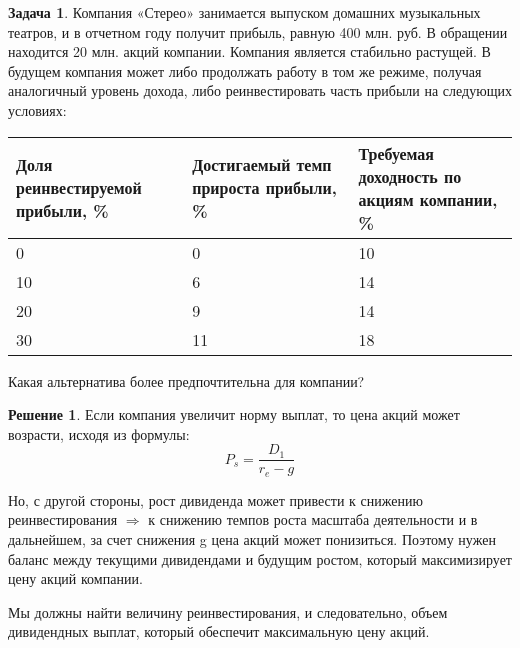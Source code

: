 \documentclass[a4paper, 14pt]{article}
\theoremstyle{plain} %
\theoremstyle{definition} %
\newtheorem*{solution}{Решение}
\newtheorem{problem}{Задача}[subsection]
\theoremstyle{remark} %
\begin{document}
\begin{problem}
	Компания «Стерео» занимается выпуском домашних музыкальных  театров,  и  в  отчетном  году  получит  прибыль, равную 400 млн. руб. В обращении находится 20 млн. акций компании. Компания является стабильно растущей. В будущем компания  может  либо  продолжать  работу  в  том  же  режиме, получая  аналогичный  уровень  дохода,  либо  реинвестировать часть прибыли на следующих условиях:
\begin{center}
\begin{tabular}{|p{4.4cm}|p{4.4cm}|p{4.4cm}|}
\hline
Доля реинвестируемой прибыли, \% & Достигаемый темп прироста прибыли, \% & Требуемая доходность по акциям компании, \%  \\
\hline
0                                & 0                                     & 10                                           \\
\hline
10                               & 6                                     & 14                                           \\
\hline
20                               & 9                                     & 14                                           \\
\hline
30                               & 11                                    & 18                                           \\
\hline
\end{tabular}
\end{center}
Какая альтернатива более предпочтительна для компании?
\begin{solution}
	Если компания увеличит норму выплат, то цена акций может возрасти, исходя из формулы:
	\begin{equation}\label{eq:stocksprice}
		P_{s} = \frac{D_{1}}{r_{e}-g}
	\end{equation}

	Но, с другой стороны, рост дивиденда может привести к снижению реинвестирования $\Rightarrow$ к снижению темпов роста масштаба деятельности и в дальнейшем, за счет снижения g цена акций может понизиться. Поэтому нужен баланс между текущими дивидендами и будущим ростом, который максимизирует цену акций компании.

	Мы должны найти величину реинвестирования, и следовательно, объем дивидендных выплат, который обеспечит максимальную цену акций.


\end{solution}
\end{problem}
\end{document}
